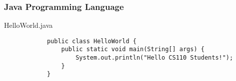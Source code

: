 \documentclass[10pt, compress]{beamer}
\begin{document}
\begin{frame}[fragile]
	\frametitle{Java Programming Language}
	\begin{block}{HelloWorld.java}
		\begin{verbatim}
			public class HelloWorld {
			    public static void main(String[] args) {
			        System.out.println("Hello CS110 Students!");
			    }
			}
		\end{verbatim}
	\end{block}
\end{frame}

\end{document}
